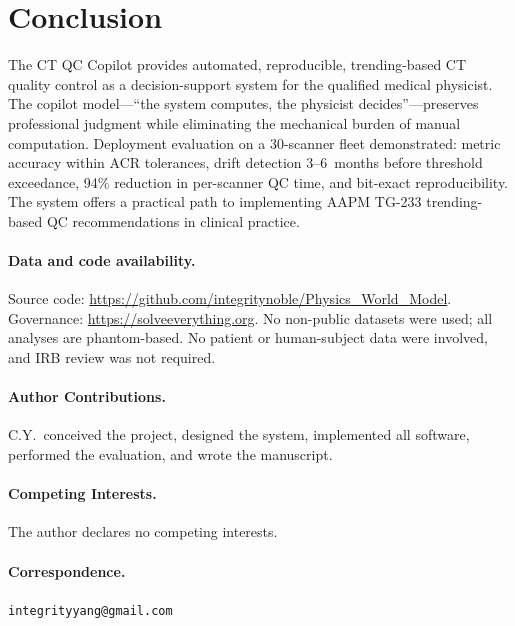 \documentclass[11pt]{article}
\begin{document}
\section{Conclusion}
\label{sec:conclusion}

The CT QC Copilot provides automated, reproducible, trending-based
CT quality control as a decision-support system for the qualified
medical physicist.
The copilot model---``the system computes, the physicist
decides''---preserves professional judgment while eliminating the
mechanical burden of manual computation.
Deployment evaluation on a 30-scanner fleet demonstrated: metric
accuracy within ACR tolerances, drift detection 3--6~months before
threshold exceedance, 94\% reduction in per-scanner QC time, and
bit-exact reproducibility.
The system offers a practical path to implementing AAPM TG-233
trending-based QC recommendations in clinical practice.

\paragraph{Data and code availability.}
Source code: \url{https://github.com/integritynoble/Physics_World_Model}.
Governance: \url{https://solveeverything.org}.
No non-public datasets were used; all analyses are phantom-based.
No patient or human-subject data were involved, and IRB review
was not required.

\paragraph{Author Contributions.}
C.Y.\ conceived the project, designed the system, implemented all
software, performed the evaluation, and wrote the manuscript.

\paragraph{Competing Interests.}
The author declares no competing interests.

\paragraph{Correspondence.}
\texttt{integrityyang@gmail.com}



\end{document}
